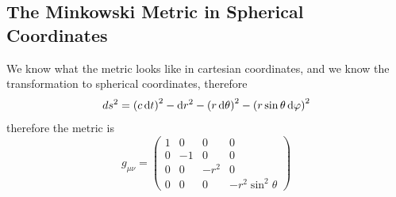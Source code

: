 \subsection{The Minkowski Metric in Spherical Coordinates}
We know what the metric looks like in cartesian coordinates, and we know the transformation to spherical coordinates, therefore
\begin{equation}
    ds^2 = \left(c\mathop{}\!\mathrm{d} t\right)^2 - \mathop{}\!\mathrm{d} r^2 - \left(r\mathop{}\!\mathrm{d} \theta\right)^2 - \left(r\sin\theta\mathop{}\!\mathrm{d} \varphi\right)^2
\end{equation}
therefore the metric is
\begin{equation}
    g_{\mu\nu} = \begin{pmatrix}
        1&0&0&0 \\ 0&-1&0&0 \\ 0&0&-r^2&0 \\ 0&0&0&-r^2\sin^2\theta
    \end{pmatrix}
\end{equation}